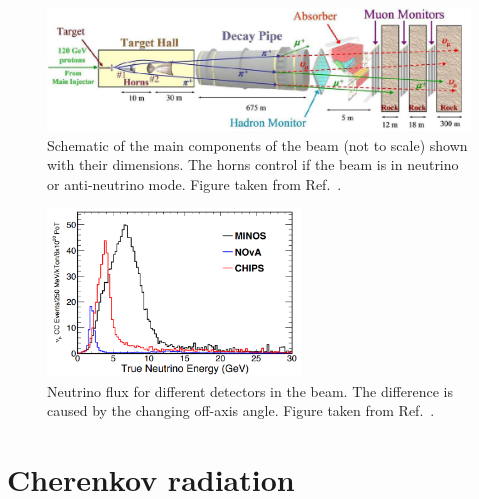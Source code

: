 \begin{figure} %
    \includegraphics[width=\textwidth]{diagrams/4-chips/numi_beam.png}
    \caption[Schematic of the \numi beam.]
    {Schematic of the main components of the \numi beam (not to scale) shown with their
        dimensions. The horns control if the beam is in neutrino or anti-neutrino mode. Figure
        taken from Ref.~\cite{adamson2016}.}
    \label{fig:numi_beam}
\end{figure}

\begin{figure} %
    \includegraphics[width=0.6\textwidth]{diagrams/4-chips/numi_axis.png}
    \caption[Neutrino flux for different detectors in the \numi beam.]
    {Neutrino flux for different detectors in the \numi beam.
        The difference is caused by the changing off-axis angle.
        Figure taken from Ref.~\cite{adamson2013}.}
    \label{fig:numi_axis}
\end{figure}

\section{Cherenkov radiation} %
\label{sec:chips_cherenkov} %

